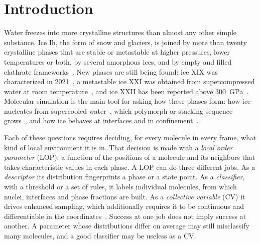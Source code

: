 \documentclass[11pt,a4paper]{article}
\begin{document}
\section{Introduction}\label{sec:intro}
Water freezes into more crystalline structures than almost any other simple
substance. Ice Ih, the form of snow and glaciers, is joined by more than twenty
crystalline phases that are stable or metastable at higher pressures, lower
temperatures or both, by several amorphous ices, and by empty and filled
clathrate frameworks~\cite{Salzmann_2019,Hansen2021,Loerting2020}. New phases
are still being found: ice XIX was characterized in
2021~\cite{Gasser2021,Yamane2021}, a metastable ice XXI was obtained from
supercompressed water at room temperature~\cite{Lee2025}, and ice XXII has
been reported above 300~GPa~\cite{Osmond2026}. Molecular simulation is the main
tool for asking how these phases form: how ice nucleates from supercooled
water~\cite{Sosso2016,Sanz2013,HajiAkbari2015,Lupi2017,Piaggi2022}, which
polymorph or stacking sequence grows~\cite{Moore2011,Malkin_2012,Lupi2017},
and how ice behaves at interfaces and in confinement~\cite{Shi2022,Moradzadeh2023}.

Each of these questions requires deciding, for every molecule in every frame,
what kind of local environment it is in. That decision is made with a
\emph{local order parameter} (LOP): a function of the positions of a molecule
and its neighbors that takes characteristic values in each phase. A LOP can do
three different jobs. As a \emph{descriptor} its distribution fingerprints a
phase or a state point. As a \emph{classifier}, with a threshold or a set of
rules, it labels individual molecules, from which nuclei, interfaces and phase
fractions are built. As a \emph{collective variable} (CV) it drives enhanced
sampling, which additionally requires it to be continuous and differentiable
in the coordinates~\cite{Karmakar2021,Neha2022}. Success at one job does not
imply success at another. A parameter whose distributions differ on average
may still misclassify many molecules, and a good classifier may be useless as
a CV.
\end{document}
